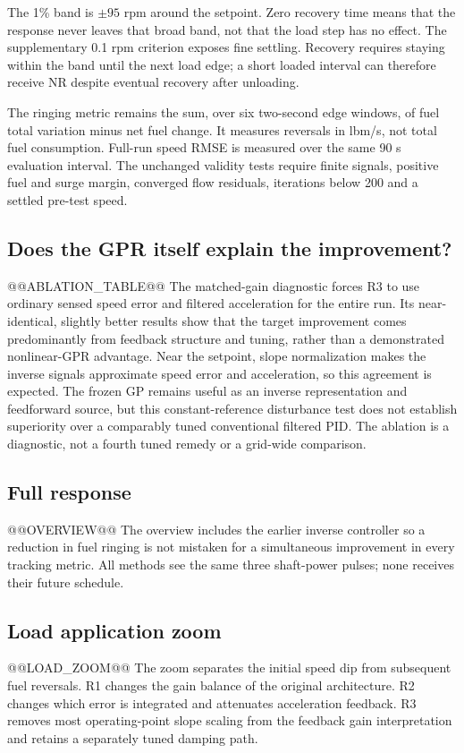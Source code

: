 The 1\% band is $\pm95$ rpm around the setpoint. Zero recovery time means that the response never leaves that broad band, not that the load step has no effect. The supplementary 0.1 rpm criterion exposes fine settling. Recovery requires staying within the band until the next load edge; a short loaded interval can therefore receive NR despite eventual recovery after unloading.

The ringing metric remains the sum, over six two-second edge windows, of fuel total variation minus net fuel change. It measures reversals in lbm/s, not total fuel consumption. Full-run speed RMSE is measured over the same 90 s evaluation interval. The unchanged validity tests require finite signals, positive fuel and surge margin, converged flow residuals, iterations below 200 and a settled pre-test speed.

\subsection{Does the GPR itself explain the improvement?}
@@ABLATION_TABLE@@
The matched-gain diagnostic forces R3 to use ordinary sensed speed error and filtered acceleration for the entire run. Its near-identical, slightly better results show that the target improvement comes predominantly from feedback structure and tuning, rather than a demonstrated nonlinear-GPR advantage. Near the setpoint, slope normalization makes the inverse signals approximate speed error and acceleration, so this agreement is expected. The frozen GP remains useful as an inverse representation and feedforward source, but this constant-reference disturbance test does not establish superiority over a comparably tuned conventional filtered PID. The ablation is a diagnostic, not a fourth tuned remedy or a grid-wide comparison.

\clearpage
\subsection{Full response}
@@OVERVIEW@@
The overview includes the earlier inverse controller so a reduction in fuel ringing is not mistaken for a simultaneous improvement in every tracking metric. All methods see the same three shaft-power pulses; none receives their future schedule.

\clearpage
\subsection{Load application zoom}
@@LOAD_ZOOM@@
The zoom separates the initial speed dip from subsequent fuel reversals. R1 changes the gain balance of the original architecture. R2 changes which error is integrated and attenuates acceleration feedback. R3 removes most operating-point slope scaling from the feedback gain interpretation and retains a separately tuned damping path.

